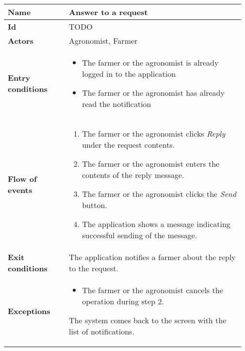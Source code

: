 \begin{center}
	\begin{tabular}{@{}p{0.25\linewidth} p{0.72\linewidth}@{}}
		\toprule
		\textbf{Name}               & Answer to a request\\
		\midrule
		\textbf{Id}                 & TODO\\
		\midrule
		\textbf{Actors}             & Agronomist, Farmer\\
		\midrule
		
		\textbf{Entry conditions}   & \begin{itemize}[leftmargin=.4cm,noitemsep,topsep=0pt,before=\vspace{-3mm},after=\vspace{-4mm}]
		    \item The farmer or the agronomist is already logged in to the application
		    \item The farmer or the agronomist has already read the notification
		\end{itemize}\\
		\midrule
		
		\textbf{Flow of events}     & \begin{enumerate}[leftmargin=.4cm,noitemsep,topsep=0pt,before=\vspace{-3mm},after=\vspace{-4mm}]
		    \item The farmer or the agronomist clicks \textit{Reply} under the request contents.
		    \item The farmer or the agronomist enters the contents of the reply message.
		    \item The farmer or the agronomist clicks the \textit{Send} button.
		    \item The application shows a message indicating successful sending of the message.
		\end{enumerate}\\
		\midrule
		\textbf{Exit conditions}    & The application notifies a farmer about the reply to the request. \\
		\midrule
		
		\textbf{Exceptions}         & \begin{itemize}[leftmargin=.4cm,noitemsep,topsep=0pt,before=\vspace{-3mm}]
		   \item The farmer or the agronomist cancels the operation during step 2.
		\end{itemize}
	    The system comes back to the screen with the list of notifications.\\
		\bottomrule
	\end{tabular}
\end{center}

